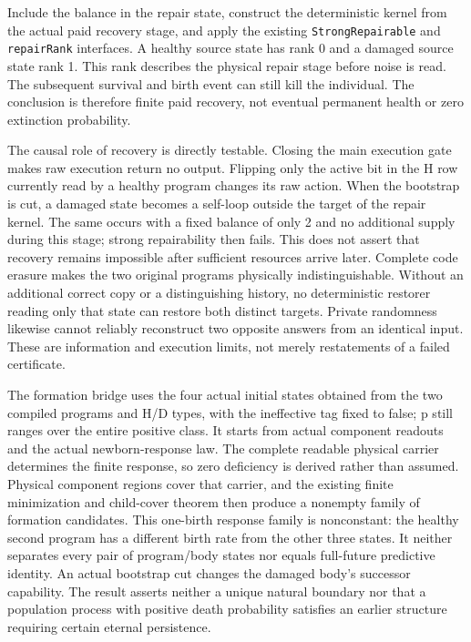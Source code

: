 \documentclass[
  english,
  11pt,
  oneside]{book}
\newcounter{none} %
\begin{document}
Include the balance in the repair state, construct the deterministic kernel from the actual paid recovery stage, and apply the existing \nolinkurl{StrongRepairable} and \texttt{repairRank} interfaces. A healthy source state has rank 0 and a damaged source state rank 1. This rank describes the physical repair stage before noise is read. The subsequent survival and birth event can still kill the individual. The conclusion is therefore finite paid recovery, not eventual permanent health or zero extinction probability.

The causal role of recovery is directly testable. Closing the main execution gate makes raw execution return no output. Flipping only the active bit in the H row currently read by a healthy program changes its raw action. When the bootstrap is cut, a damaged state becomes a self-loop outside the target of the repair kernel. The same occurs with a fixed balance of only 2 and no additional supply during this stage; strong repairability then fails. This does not assert that recovery remains impossible after sufficient resources arrive later. Complete code erasure makes the two original programs physically indistinguishable. Without an additional correct copy or a distinguishing history, no deterministic restorer reading only that state can restore both distinct targets. Private randomness likewise cannot reliably reconstruct two opposite answers from an identical input. These are information and execution limits, not merely restatements of a failed certificate.

The formation bridge uses the four actual initial states obtained from the two compiled programs and H/D types, with the ineffective tag fixed to false; p still ranges over the entire positive class. It starts from actual component readouts and the actual newborn-response law. The complete readable physical carrier determines the finite response, so zero deficiency is derived rather than assumed. Physical component regions cover that carrier, and the existing finite minimization and child-cover theorem then produce a nonempty family of formation candidates. This one-birth response family is nonconstant: the healthy second program has a different birth rate from the other three states. It neither separates every pair of program/body states nor equals full-future predictive identity. An actual bootstrap cut changes the damaged body's successor capability. The result asserts neither a unique natural boundary nor that a population process with positive death probability satisfies an earlier structure requiring certain eternal persistence.
\end{document}
